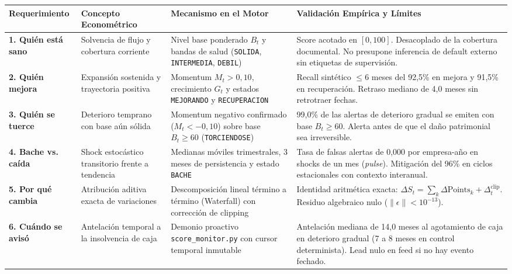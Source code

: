 \documentclass[10pt,a4paper]{article}
\begin{document}
\begin{center}
\small
\begin{tabularx}{\textwidth}{p{2.6cm}p{3.2cm}p{4.2cm}X}
\toprule
\textbf{Requerimiento} & \textbf{Concepto Econométrico} & \textbf{Mecanismo en el Motor} & \textbf{Validación Empírica y Límites} \\
\midrule
\textbf{1. Quién está sano} & Solvencia de flujo y cobertura corriente & Nivel base ponderado $B_t$ y bandas de salud (\texttt{SOLIDA}, \texttt{INTERMEDIA}, \texttt{DEBIL}) & Score acotado en $[0, 100]$. Desacoplado de la cobertura documental. No presupone inferencia de default externo sin etiquetas de supervisión. \\
\textbf{2. Quién mejora} & Expansión sostenida y trayectoria positiva & Momentum $M_t > 0{,}10$, crecimiento $G_t$ y estados \texttt{MEJORANDO} y \texttt{RECUPERACION} & Recall sintético $\le 6$ meses del 92,5\% en mejora y 91,5\% en recuperación. Retraso mediano de 4,0 meses sin retrotraer fechas. \\
\textbf{3. Quién se tuerce} & Deterioro temprano con base aún sólida & Momentum negativo confirmado ($M_t < -0{,}10$) sobre base $B_t \ge 60$ (\texttt{TORCIENDOSE}) & 99,0\% de las alertas de deterioro gradual se emiten con base $B_t \ge 60$. Alerta antes de que el daño patrimonial sea irreversible. \\
\textbf{4. Bache vs. caída} & Shock estocástico transitorio frente a tendencia & Medianas móviles trimestrales, 3 meses de persistencia y estado \texttt{BACHE} & Tasa de falsas alertas de 0,000 por empresa-año en shocks de un mes (\emph{pulse}). Mitigación del 96\% en ciclos estacionales con contexto interanual. \\
\textbf{5. Por qué cambia} & Atribución aditiva exacta de variaciones & Descomposición lineal término a término (Waterfall) con corrección de clipping & Identidad aritmética exacta: $\Delta S_t = \sum_k \Delta \text{Points}_k + \Delta_t^{\mathrm{clip}}$. Residuo algebraico nulo ($\|\epsilon\| < 10^{-13}$). \\
\textbf{6. Cuándo se avisó} & Antelación temporal a la insolvencia de caja & Demonio proactivo \texttt{score\_monitor.py} con cursor temporal inmutable & Antelación mediana de 14,0 meses al agotamiento de caja en deterioro gradual (7 a 8 meses en control determinista). Lead nulo en feed si no hay evento fechado. \\
\bottomrule
\end{tabularx}
\end{center}
\end{document}
